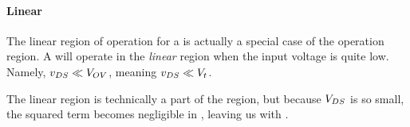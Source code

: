 \paragraph{Linear}\label{par:MOSFET_Linear_Region}
The linear region of operation for a  is actually a special case of the  operation region.
A  will operate in the \emph{linear} region when the input voltage is quite low.
Namely, $v_{DS} \ll V_{OV}$, meaning $v_{DS} \ll V_{t}$.

The linear region is technically a part of the  region, but because $V_{DS}$ is so small, the squared term becomes negligible in , leaving us with .


